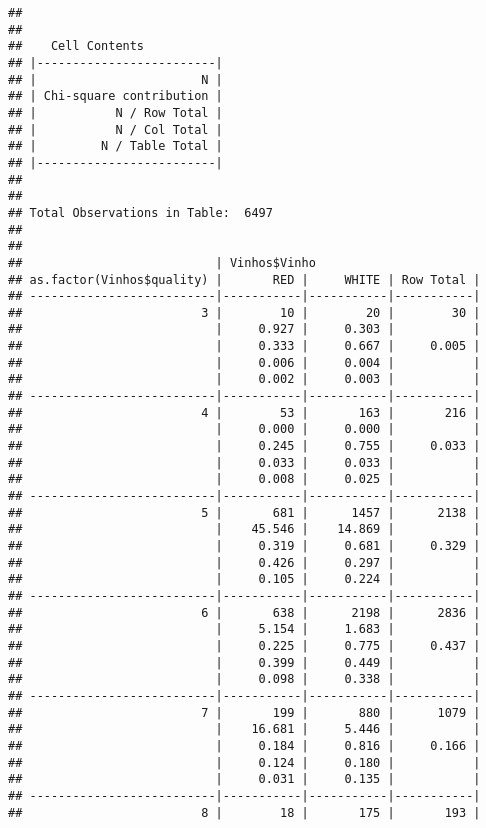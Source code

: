 \documentclass[]{article}
\begin{document}
\begin{verbatim}
## 
##  
##    Cell Contents
## |-------------------------|
## |                       N |
## | Chi-square contribution |
## |           N / Row Total |
## |           N / Col Total |
## |         N / Table Total |
## |-------------------------|
## 
##  
## Total Observations in Table:  6497 
## 
##  
##                           | Vinhos$Vinho 
## as.factor(Vinhos$quality) |       RED |     WHITE | Row Total | 
## --------------------------|-----------|-----------|-----------|
##                         3 |        10 |        20 |        30 | 
##                           |     0.927 |     0.303 |           | 
##                           |     0.333 |     0.667 |     0.005 | 
##                           |     0.006 |     0.004 |           | 
##                           |     0.002 |     0.003 |           | 
## --------------------------|-----------|-----------|-----------|
##                         4 |        53 |       163 |       216 | 
##                           |     0.000 |     0.000 |           | 
##                           |     0.245 |     0.755 |     0.033 | 
##                           |     0.033 |     0.033 |           | 
##                           |     0.008 |     0.025 |           | 
## --------------------------|-----------|-----------|-----------|
##                         5 |       681 |      1457 |      2138 | 
##                           |    45.546 |    14.869 |           | 
##                           |     0.319 |     0.681 |     0.329 | 
##                           |     0.426 |     0.297 |           | 
##                           |     0.105 |     0.224 |           | 
## --------------------------|-----------|-----------|-----------|
##                         6 |       638 |      2198 |      2836 | 
##                           |     5.154 |     1.683 |           | 
##                           |     0.225 |     0.775 |     0.437 | 
##                           |     0.399 |     0.449 |           | 
##                           |     0.098 |     0.338 |           | 
## --------------------------|-----------|-----------|-----------|
##                         7 |       199 |       880 |      1079 | 
##                           |    16.681 |     5.446 |           | 
##                           |     0.184 |     0.816 |     0.166 | 
##                           |     0.124 |     0.180 |           | 
##                           |     0.031 |     0.135 |           | 
## --------------------------|-----------|-----------|-----------|
##                         8 |        18 |       175 |       193 | 

\end{verbatim}
\end{document}
